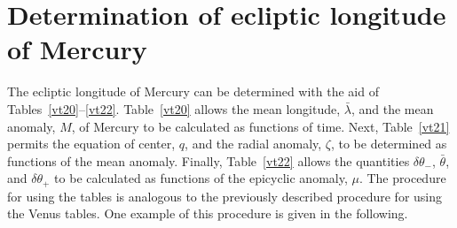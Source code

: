 \section{Determination of ecliptic longitude of Mercury}
The ecliptic longitude of Mercury can be determined with the aid of Tables~\ref{vt20}--\ref{vt22}. Table~\ref{vt20} allows
the mean longitude, $\bar{\lambda}$, and the mean anomaly, $M$, of Mercury to be calculated as functions of
time. Next, Table~\ref{vt21} permits the equation of center, $q$, and the radial anomaly, $\zeta$, to
be determined as functions of the mean anomaly. Finally, Table~\ref{vt22} allows the quantities
$\delta\theta_-$, $\bar{\theta}$, and $\delta\theta_+$ to be calculated as functions of the epicyclic
anomaly, $\mu$.  The procedure for using the tables is analogous to the previously described procedure for
using the Venus tables.
One example of this procedure is given in the following.

